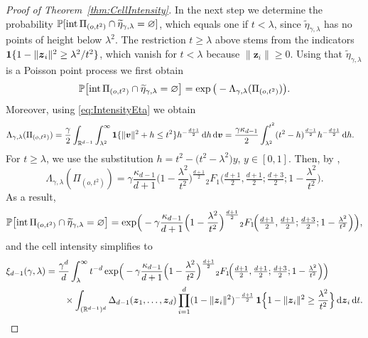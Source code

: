 \documentclass[11pt,a4paper]{article}
\theoremstyle{plain}
\theoremstyle{definition}
\theoremstyle{remark}
\newcommand{\dint}{\textup{d}}
\newcommand{\bz}{\boldsymbol{z}}
\newcommand{\bv}{\boldsymbol{v}}
\def\PP{\mathbb{P}}
\def\RR{\mathbb{R}}
\begin{document}
\begin{proof}[Proof of Theorem~\ref{thm:CellIntensity}]
	In the next step we determine the probability $\PP[{\rm int}\,\Pi_{(o,t^2)}\cap\widetilde\eta_{\gamma,\lambda}=\varnothing]$, which equals one if $t<\lambda$, since $\widetilde\eta_{\gamma,\lambda}$ has no points of height below $\lambda^2$. The restriction $t\ge\lambda$ above stems from the indicators ${\bf 1}\{1-\|\bz_i\|^2\ge\lambda^2/t^2\}$, which vanish for $t<\lambda$ because $\|\bz_i\|\ge 0$. Using that $\widetilde\eta_{\gamma,\lambda}$ is a Poisson point process we first obtain
	$$
		\PP\big[{\rm int}\,\Pi_{(o,t^2)}\cap\widetilde\eta_{\gamma,\lambda}=\varnothing\big] = \exp\big(-\Lambda_{\gamma,\lambda}(\Pi_{(o,t^2)})\big).
	$$
	Moreover, using \eqref{eq:IntensityEta} we obtain
	\begin{align*}
		\Lambda_{\gamma,\lambda}(\Pi_{(o,t^2)})
		 & =
		\frac{\gamma}{2}
		\int_{\RR^{d-1}}
		\int_{\lambda^2}^{\infty}
		{\bf 1}\{\|\bv\|^2+h\le t^2\}
		h^{-\frac{d+1}{2}}
		\,\dint h\,\dint\bv =
		\frac{\gamma\kappa_{d-1}}{2}
		\int_{\lambda^2}^{t^2}
		(t^2-h)^{\frac{d-1}{2}}
		h^{-\frac{d+1}{2}}
		\,\dint h .
	\end{align*}
	For \(t\ge\lambda\), we use the substitution $h=t^2-\bigl(t^2-\lambda^2\bigr)y$, $y\in[0,1]$.
	Then, by \cite[Equation~15.6.1]{NIST},
	\[
		\Lambda_{\gamma,\lambda}(\Pi_{(o,t^2)})
		=
		\gamma\frac{\kappa_{d-1}}{d+1}
		\Big(1-\frac{\lambda^2}{t^2}\Big)^{\frac{d+1}{2}}
		{}_2F_1\!\Big(
		\tfrac{d+1}{2},\tfrac{d+1}{2};
		\tfrac{d+3}{2};
		1-\frac{\lambda^2}{t^2}
		\Big).
	\]
	As a result,
	$$
		\PP\big[{\rm int}\,\Pi_{(o,t^2)}\cap\widetilde\eta_{\gamma,\lambda}=\varnothing\big] = \exp\!\Big(
		-\gamma\frac{\kappa_{d-1}}{d+1}
		\Big(1-\frac{\lambda^2}{t^2}\Big)^{\frac{d+1}{2}}
		{}_2F_1\!\Big(\tfrac{d+1}{2},\tfrac{d+1}{2};\tfrac{d+3}{2};1-\tfrac{\lambda^2}{t^2}\Big)
		\Big),
	$$
	and the cell intensity simplifies to
	\begin{align*}
		\xi_{d-1}(\gamma,\lambda) & = \frac{\gamma^d}{d}\int_\lambda^\infty t^{-d}\exp\!\Big(
		-\gamma\frac{\kappa_{d-1}}{d+1}
		\Big(1-\frac{\lambda^2}{t^2}\Big)^{\frac{d+1}{2}}
		{}_2F_1\!\Big(\tfrac{d+1}{2},\tfrac{d+1}{2};\tfrac{d+3}{2};1-\tfrac{\lambda^2}{t^2}\Big)
		\Big)                                                                                                                                                                                                                        \\
		                          & \qquad\times \int_{(\RR^{d-1})^d}\Delta_{d-1}(\bz_1,\ldots,\bz_d)\prod_{i=1}^d(1-\|\bz_i\|^2)^{-\frac{d+1}{2}}\,{\bf 1}\Big\{1-\|\bz_i\|^2\geq\frac{\lambda^2}{t^2}\Big\}\,\dint\bz_i\, \dint t.
	\end{align*}


\end{proof}
\end{document}
